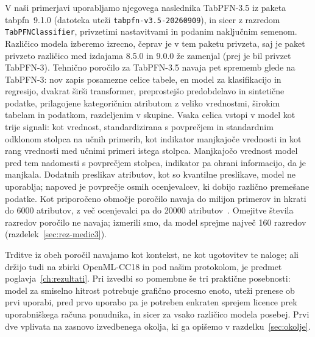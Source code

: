 \documentclass[a4paper,12pt,openright]{book}
\begin{document}
V naši primerjavi uporabljamo njegovega naslednika TabPFN-3.5 iz paketa
tabpfn~9.1.0 (datoteka uteži \texttt{tabpfn-v3.5-20260909}), in sicer z
razredom \texttt{TabPFNClassifier}, privzetimi nastavitvami in podanim
naključnim semenom. Različico modela izberemo izrecno, čeprav je v tem paketu
privzeta, saj je paket privzeto različico med izdajama 8.5.0 in 9.0.0 že
zamenjal (prej je bil privzet TabPFN-3). Tehnično poročilo za TabPFN-3.5
navaja pet sprememb glede na TabPFN-3: nov zapis posamezne celice tabele, en
model za klasifikacijo in regresijo, dvakrat širši transformer, preprostejšo
predobdelavo in sintetične podatke, prilagojene kategoričnim atributom z veliko
vrednostmi, širokim tabelam in podatkom, razdeljenim v skupine. Vsaka celica
vstopi v model kot trije signali: kot vrednost, standardizirana s povprečjem in
standardnim odklonom stolpca na učnih primerih, kot indikator manjkajoče
vrednosti in kot rang vrednosti med učnimi primeri istega stolpca. Manjkajočo
vrednost model pred tem nadomesti s povprečjem stolpca, indikator pa ohrani
informacijo, da je manjkala. Dodatnih preslikav atributov, kot so kvantilne
preslikave, model ne uporablja; napoved je povprečje osmih ocenjevalcev, ki
dobijo različno premešane podatke. Kot priporočeno območje poročilo navaja do
milijon primerov in hkrati do 6000 atributov, z več ocenjevalci pa do
\num{20000} atributov~\cite{jager2026tabpfn35}. Omejitve števila razredov
poročilo ne navaja; izmerili smo, da model sprejme največ 160 razredov
(razdelek~\ref{sec:rez-medic3}).

Trditve iz obeh poročil navajamo kot kontekst, ne kot ugotovitev te naloge;
ali držijo tudi na zbirki OpenML-CC18 in pod našim protokolom, je predmet
poglavja~\ref{ch:rezultati}. Pri izvedbi so pomembne še tri praktične posebnosti: model
za smiselno hitrost potrebuje grafično procesno enoto, uteži prenese ob prvi
uporabi, pred prvo uporabo pa je potreben enkraten sprejem licence prek
uporabniškega računa ponudnika, in sicer za vsako različico modela posebej.
Prvi dve vplivata na zasnovo izvedbenega okolja, ki ga opišemo v
razdelku~\ref{sec:okolje}.
\end{document}
